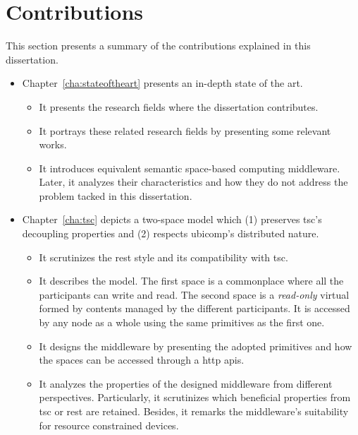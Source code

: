 \section{Contributions}



This section presents a summary of the contributions explained in this dissertation.
\begin{itemize}
  \item Chapter~\ref{cha:stateoftheart} presents an in-depth state of the art.
    \begin{itemize}
      \item It presents the research fields where the dissertation contributes.
      \item It portrays these related research fields by presenting some relevant works.
      \item It introduces equivalent semantic space-based computing middleware.
	    Later, it analyzes their characteristics and how they do not address the problem tacked in this dissertation.
    \end{itemize}
  
  \item Chapter~\ref{cha:tsc} depicts a two-space model which (1) preserves \ac{tsc}'s decoupling properties and (2) respects \ac{ubicomp}'s distributed nature.
    \begin{itemize}
      \item It scrutinizes the \ac{rest} style and its compatibility with \ac{tsc}.
      \item It describes the model. %
            The first space is a commonplace where all the participants can write and read.
            The second space is a \emph{read-only} virtual \Space{} formed by contents managed by the different participants.
            It is accessed by any node as a whole using the same primitives as the first one.
      \item It designs the middleware by presenting the adopted primitives and how the spaces can be accessed through a \ac{http} \acp{api}.
      \item It analyzes the properties of the designed middleware from different perspectives.
	    Particularly, it scrutinizes which beneficial properties from \ac{tsc} or \ac{rest} are retained.
	    Besides, it remarks the middleware's suitability for resource constrained devices.
    \end{itemize}
  

\end{itemize}
